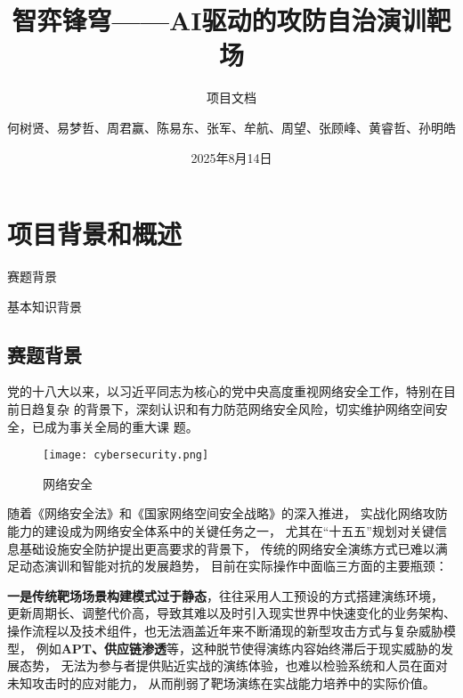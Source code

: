 \documentclass[lang=cn,10pt]{elegantbook}
\title{智弈锋穹——AI驱动的攻防自治演训靶场}
\subtitle{项目文档}
\author{何树贤、易梦哲、周君赢、陈易东、张军、牟航、周望、张顾峰、黄睿哲、孙明皓}
\institute{武汉大学 国家网络安全学院}
\date{2025年8月14日}
\begin{document}

\maketitle
\frontmatter

\tableofcontents

\mainmatter


\chapter{项目背景和概述}
\begin{introduction}
    \item 赛题背景
    \item 基本知识背景
\end{introduction}

\section{赛题背景}

党的十八大以来，以习近平同志为核心的党中央高度重视网络安全工作，特别在目前日趋复杂
的背景下，深刻认识和有力防范网络安全风险，切实维护网络空间安全，已成为事关全局的重大课
题。

\begin{figure}[htbp]
\centering
\texttt{[image: cybersecurity.png]}  %
\caption{网络安全}  %
\label{fig:网络安全}  %
\end{figure}

随着《网络安全法》和《国家网络空间安全战略》的深入推进，
实战化网络攻防能力的建设成为网络安全体系中的关键任务之一，
尤其在“十五五”规划对关键信息基础设施安全防护提出更高要求的背景下，
传统的网络安全演练方式已难以满足动态演训和智能对抗的发展趋势，
目前在实际操作中面临三方面的主要瓶颈：

\textbf{一是传统靶场场景构建模式过于静态}，往往采用人工预设的方式搭建演练环境，
更新周期长、调整代价高，导致其难以及时引入现实世界中快速变化的业务架构、
操作流程以及技术组件，也无法涵盖近年来不断涌现的新型攻击方式与复杂威胁模型，
例如\textbf{APT、供应链渗透}等，这种脱节使得演练内容始终滞后于现实威胁的发展态势，
无法为参与者提供贴近实战的演练体验，也难以检验系统和人员在面对未知攻击时的应对能力，
从而削弱了靶场演练在实战能力培养中的实际价值。
\end{document}
